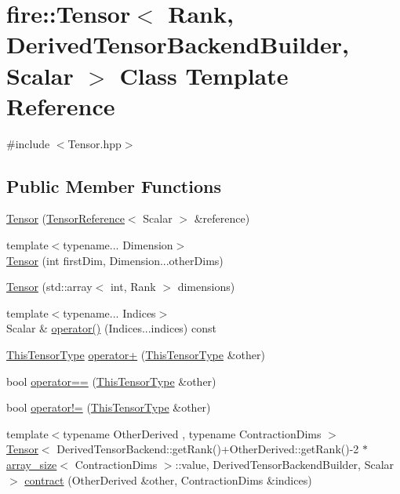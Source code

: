 \hypertarget{a00299}{}\section{fire\+:\+:Tensor$<$ Rank, Derived\+Tensor\+Backend\+Builder, Scalar $>$ Class Template Reference}
\label{a00299}


{\ttfamily \#include $<$Tensor.\+hpp$>$}

\subsection*{Public Member Functions}
\begin{DoxyCompactItemize}
\item 
\hyperlink{a00299_a483bba67036bbf284bf916b3ba08973d}{Tensor} (\hyperlink{a00822_a1bf491fd1c876e2808648b2fd291e3dd}{Tensor\+Reference}$<$ Scalar $>$ \&reference)
\item 
{\footnotesize template$<$typename... Dimension$>$ }\\\hyperlink{a00299_abbfb7560aca654a8a7ec5ab18b6af16a}{Tensor} (int first\+Dim, Dimension...\+other\+Dims)
\item 
\hyperlink{a00299_a4b2b898dd5d6c9dec53d0fa1bf0c6591}{Tensor} (std\+::array$<$ int, Rank $>$ dimensions)
\item 
{\footnotesize template$<$typename... Indices$>$ }\\Scalar \& \hyperlink{a00299_a0411f345018b784a81f65bd1ef393cca}{operator()} (Indices...\+indices) const 
\item 
\hyperlink{a00299_ac86105ceb5e209854b2554a755024bd4}{This\+Tensor\+Type} \hyperlink{a00299_a20377472ae56dcaa2c0f67feb13900e7}{operator+} (\hyperlink{a00299_ac86105ceb5e209854b2554a755024bd4}{This\+Tensor\+Type} \&other)
\item 
bool \hyperlink{a00299_a5f24a2528292de76b6c52e2cc99acf9c}{operator==} (\hyperlink{a00299_ac86105ceb5e209854b2554a755024bd4}{This\+Tensor\+Type} \&other)
\item 
bool \hyperlink{a00299_a53ac3eadb4a5047c56e749b7e7c4d53d}{operator!=} (\hyperlink{a00299_ac86105ceb5e209854b2554a755024bd4}{This\+Tensor\+Type} \&other)
\item 
{\footnotesize template$<$typename Other\+Derived , typename Contraction\+Dims $>$ }\\\hyperlink{a00299}{Tensor}$<$ Derived\+Tensor\+Backend\+::get\+Rank()+Other\+Derived\+::get\+Rank()-\/2 $\ast$\hyperlink{a00035}{array\+\_\+size}$<$ Contraction\+Dims $>$\+::value, Derived\+Tensor\+Backend\+Builder, Scalar $>$ \hyperlink{a00299_abf5a45aa771a93365950eb5093a8304c}{contract} (Other\+Derived \&other, Contraction\+Dims \&indices)

\end{DoxyCompactItemize}
